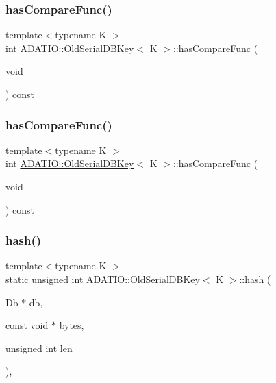 \subsubsection{\texorpdfstring{hasCompareFunc()}{hasCompareFunc()}\hspace{0.1cm}{\footnotesize\ttfamily [2/3]}}
{\footnotesize\ttfamily template$<$typename K $>$ \\
int \mbox{\hyperlink{classADATIO_1_1OldSerialDBKey}{A\+D\+A\+T\+I\+O\+::\+Old\+Serial\+D\+B\+Key}}$<$ K $>$\+::has\+Compare\+Func (\begin{DoxyParamCaption}\item[{void}]{ }\end{DoxyParamCaption}) const\hspace{0.3cm}{\ttfamily [inline]}}

\mbox{\label{classADATIO_1_1OldSerialDBKey_a121b9e6811e4c16c9b05521b923b8dc7}} 
\subsubsection{\texorpdfstring{hasCompareFunc()}{hasCompareFunc()}\hspace{0.1cm}{\footnotesize\ttfamily [3/3]}}
{\footnotesize\ttfamily template$<$typename K $>$ \\
int \mbox{\hyperlink{classADATIO_1_1OldSerialDBKey}{A\+D\+A\+T\+I\+O\+::\+Old\+Serial\+D\+B\+Key}}$<$ K $>$\+::has\+Compare\+Func (\begin{DoxyParamCaption}\item[{void}]{ }\end{DoxyParamCaption}) const\hspace{0.3cm}{\ttfamily [inline]}}

\mbox{\label{classADATIO_1_1OldSerialDBKey_a35cfd22922a3cd984d6a68cce998565f}} 
\subsubsection{\texorpdfstring{hash()}{hash()}\hspace{0.1cm}{\footnotesize\ttfamily [1/3]}}
{\footnotesize\ttfamily template$<$typename K $>$ \\
static unsigned int \mbox{\hyperlink{classADATIO_1_1OldSerialDBKey}{A\+D\+A\+T\+I\+O\+::\+Old\+Serial\+D\+B\+Key}}$<$ K $>$\+::hash (\begin{DoxyParamCaption}\item[{Db $\ast$}]{db,  }\item[{const void $\ast$}]{bytes,  }\item[{unsigned int}]{len }\end{DoxyParamCaption})\hspace{0.3cm}{\ttfamily [inline]}, {\ttfamily [static]}}

